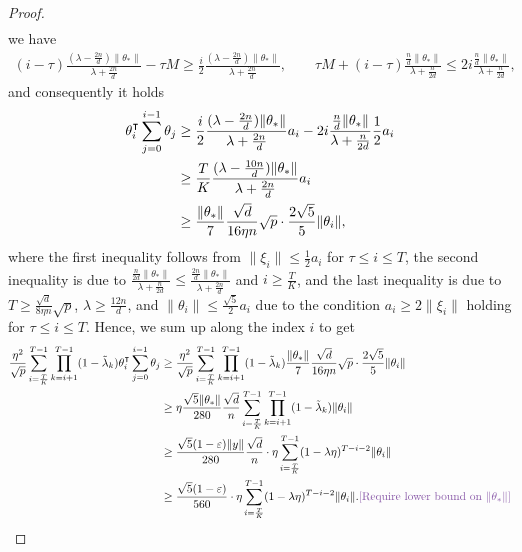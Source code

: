 \begin{proof}
\begin{align*}
    \end{align*}
    we have 
    \begin{align*}
        (i-\tau) \frac{(\lambda-\frac{2n}{d})\|\theta_*\|}{\lambda + \frac{2n}{d}} - \tau M \geq \frac{i}{2} \frac{(\lambda-\frac{2n}{d})\|\theta_*\|}{\lambda + \frac{2n}{d}}, \qquad \tau M + (i-\tau) \frac{\frac{n}{d}\|\theta_*\|}{\lambda + \frac{n}{2d}} \leq 2i \frac{\frac{n}{d}\|\theta_*\|}{\lambda + \frac{n}{2d}},
    \end{align*}
    and consequently it holds
    \begin{align*}
        \theta_i\transpose\sum_{j=0}^{i-1} \theta_j & \geq \frac{i}{2} \frac{(\lambda-\frac{2n}{d})\|\theta_*\|}{\lambda + \frac{2n}{d}} a_i - 2i \frac{\frac{n}{d}\|\theta_*\|}{\lambda + \frac{n}{2d}} \frac{1}{2}a_i \\
        & \geq \frac{T}{K} \frac{(\lambda-\frac{10n}{d})\|\theta_*\|}{\lambda + \frac{2n}{d}} a_i \\
        & \geq \frac{\|\theta_*\|}{7} \frac{\sqrt{d}}{16\eta n}\sqrt{p} \cdot \frac{2\sqrt{5}}{5}\|\theta_i\|,
    \end{align*}
    where the first inequality follows from $\|\xi_i\|\leq \frac{1}{2}a_i$ for $\tau\leq i\leq T$, the second inequality is due to $\frac{\frac{n}{2d}\|\theta_*\|}{\lambda + \frac{n}{2d}} \leq \frac{\frac{2n}{d}\|\theta_*\|}{\lambda + \frac{2n}{d}}$ and $i\geq \frac{T}{K}$, and the last inequality is due to $T\geq \frac{\sqrt{d}}{8\eta n}\sqrt{p}$, $\lambda\geq \frac{12n}{d}$, and $\|\theta_i\|\leq \frac{\sqrt{5}}{2}a_i$ due to the condition $a_i\geq 2\|\xi_i\|$ holding for $\tau\leq i\leq T$. Hence, we sum up along the index $i$ to get
    \begin{align*}
        \frac{\eta^2}{\sqrt p}\sum_{i=\frac{T}{K}}^{T-1}\prod_{k=i+1}^{T-1}(1-\tlam_k)\theta_i\transpose\sum_{j=0}^{i-1} \theta_j & \geq \frac{\eta^2}{\sqrt p}\sum_{i=\frac{T}{K}}^{T-1}\prod_{k=i+1}^{T-1}(1-\tlam_k) \frac{\|\theta_*\|}{7} \frac{\sqrt{d}}{16\eta n}\sqrt{p} \cdot \frac{2\sqrt{5}}{5}\|\theta_i\| \\
        & \geq \eta \frac{\sqrt{5}\|\theta_*\|}{280}\frac{\sqrt{d}}{n} \sum_{i=\frac{T}{K}}^{T-1}\prod_{k=i+1}^{T-1}(1-\tlam_k) \|\theta_i\| \\
        & \geq \frac{\sqrt{5}(1-\eps)\|y\|}{280}\frac{\sqrt{d}}{n} \cdot \eta\sum_{i=\frac{T}{K}}^{T-1}(1-\lambda\eta)^{T-i-2} \|\theta_i\| \\
        & \geq \frac{\sqrt{5}(1-\eps)}{560} \cdot \eta\sum_{i=\frac{T}{K}}^{T-1}(1-\lambda\eta)^{T-i-2} \|\theta_i\|. \icomment{Require lower bound on $\|\theta_*\|$}
    \end{align*}
    

\end{proof}
